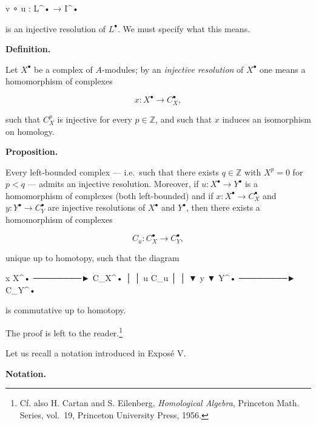 \documentclass[
  11pt,
  a4paper,
]{book}
\newenvironment{Shaded}{}{}
\newcommand{\NormalTok}[1]{#1}
\begin{document}
\begin{Shaded}
\begin{Highlighting}[]
\NormalTok{v ∘ u : L\^{}• → I\^{}•}
\end{Highlighting}
\end{Shaded}

is an injective resolution of \(L^{\bullet}\). We must specify what this
means.

\textbf{Definition.}

Let \(X^{\bullet}\) be a complex of \(A\)-modules; by an \emph{injective
resolution} of \(X^{\bullet}\) one means a homomorphism of complexes

\[ x : X^{\bullet} \to C^{\bullet}_{X}, \]

such that \(C^{p}_{X}\) is injective for every \(p \in \mathbb{Z}\), and
such that \(x\) induces an isomorphism on homology.

\textbf{Proposition.}

Every left-bounded complex --- i.e.~such that there exists
\(q \in \mathbb{Z}\) with \(X^{p} = 0\) for \(p < q\) --- admits an
injective resolution. Moreover, if \(u : X^{\bullet} \to Y^{\bullet}\)
is a homomorphism of complexes (both left-bounded) and if
\(x : X^{\bullet} \to C^{\bullet}_{X}\) and
\(y : Y^{\bullet} \to C^{\bullet}_{Y}\) are injective resolutions of
\(X^{\bullet}\) and \(Y^{\bullet}\), then there exists a homomorphism of
complexes

\[ C_{u} : C^{\bullet}_{X} \to C^{\bullet}_{Y}, \]

unique up to homotopy, such that the diagram

\begin{Shaded}
\begin{Highlighting}[]
\NormalTok{        x}
\NormalTok{X\^{}•  ────────►  C\_X\^{}•}
\NormalTok{ │                │}
\NormalTok{ u                C\_u}
\NormalTok{ │                │}
\NormalTok{ ▼      y         ▼}
\NormalTok{Y\^{}•  ────────►  C\_Y\^{}•}
\end{Highlighting}
\end{Shaded}

is commutative up to homotopy.

The proof is left to the reader.\footnote{Cf. also H. Cartan and S.
  Eilenberg, \emph{Homological Algebra}, Princeton Math. Series,
  vol.~19, Princeton University Press, 1956.}

Let us recall a notation introduced in Exposé V.

\textbf{Notation.}
\end{document}
